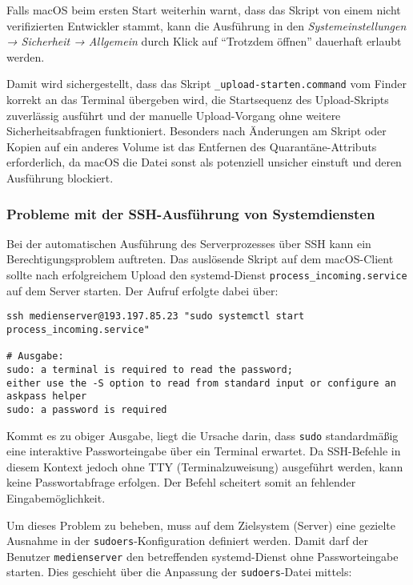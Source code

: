 \documentclass[12pt,a4paper]{report}
\begin{document}
    Falls macOS beim ersten Start weiterhin warnt, dass das Skript von einem nicht verifizierten Entwickler stammt,  
    kann die Ausführung in den \emph{Systemeinstellungen → Sicherheit → Allgemein} durch Klick auf 
    \enquote{Trotzdem öffnen} dauerhaft erlaubt werden.  

    Damit wird sichergestellt, dass das Skript \texttt{\_upload-starten.command} vom Finder korrekt an das Terminal übergeben wird, 
    die Startsequenz des Upload-Skripts zuverlässig ausführt und der manuelle Upload-Vorgang ohne weitere Sicherheitsabfragen funktioniert.  
    Besonders nach Änderungen am Skript oder Kopien auf ein anderes Volume ist das Entfernen des Quarantäne-Attributs erforderlich, 
    da macOS die Datei sonst als potenziell unsicher einstuft und deren Ausführung blockiert.

    \subsubsection*{Probleme mit der SSH-Ausführung von Systemdiensten}
    Bei der automatischen Ausführung des Serverprozesses über SSH kann ein Berechtigungsproblem auftreten.  
    Das auslösende Skript auf dem macOS-Client sollte nach erfolgreichem Upload den systemd-Dienst 
    \texttt{process\_incoming.service} auf dem Server starten. Der Aufruf erfolgte dabei über:

    \begin{verbatim}
ssh medienserver@193.197.85.23 "sudo systemctl start process_incoming.service"

# Ausgabe:
sudo: a terminal is required to read the password;
either use the -S option to read from standard input or configure an askpass helper
sudo: a password is required
    \end{verbatim}

    Kommt es zu obiger Ausgabe, liegt die Ursache darin, dass \texttt{sudo} standardmäßig eine interaktive Passworteingabe über ein Terminal erwartet.  
    Da SSH-Befehle in diesem Kontext jedoch ohne TTY (Terminalzuweisung) ausgeführt werden, kann keine Passwortabfrage erfolgen.  
    Der Befehl scheitert somit an fehlender Eingabemöglichkeit.

    Um dieses Problem zu beheben, muss auf dem Zielsystem (Server) eine gezielte Ausnahme in der \texttt{sudoers}-Konfiguration definiert werden.  
    Damit darf der Benutzer \texttt{medienserver} den betreffenden systemd-Dienst ohne Passworteingabe starten.  
    Dies geschieht über die Anpassung der \texttt{sudoers}-Datei mittels:
\end{document}
